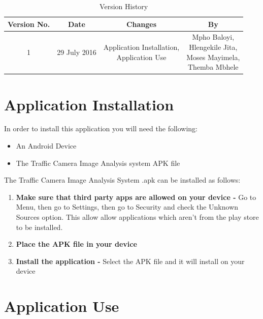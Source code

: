 \documentclass[a4paper,12pt]{article}
\begin{document}
\newpage
\tableofcontents
\newpage

\newpage
\begin{table}[ht]
 \centering
 \caption{Version History}
 \label{tab:table1}
 \begin{tabular}{cccc}
   \toprule
    Version No. & Date & Changes & By\\
    \midrule
    1 & 29 July 2016 & \makecell{Application Installation, \\ Application Use} & \makecell{Mpho Baloyi,\\ Hlengekile Jita,\\ Moses Mayimela,\\ Themba Mbhele} \\
    \bottomrule
  \end{tabular}
\end{table}
\newpage

\section{Application Installation}
In order to install this application you will need the following:
\begin{itemize}
\item An Android Device
\item The Traffic Camera Image Analysis system APK file
\end{itemize}

The Traffic Camera Image Analysis System .apk can be installed as follows:
\begin{enumerate}
\item \textbf{Make sure that third party apps are allowed on your device -} Go to Menu, then go to Settings, then go to Security and check the Unknown Sources option. This allow allow applications which aren't from the play store to be installed.
\item \textbf{Place the APK file in your device} 
\item \textbf{Install the application -} Select the APK file and it will install on your device
\end{enumerate}

\section{Application Use}
\end{document}
